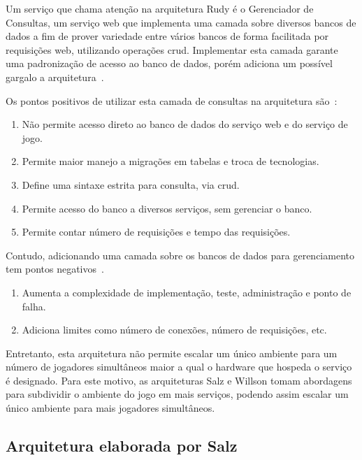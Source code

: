Um serviço que chama atenção na arquitetura Rudy é o Gerenciador de Consultas, um serviço web que implementa uma camada sobre diversos bancos de dados a fim de prover variedade entre vários bancos de forma facilitada por requisições web, utilizando operações \ac{crud}.
%
Implementar esta camada garante uma padronização de acesso ao banco de dados, porém adiciona um possível gargalo a arquitetura~\cite{matthiasrudy2011}.



Os pontos positivos de utilizar esta camada de consultas na arquitetura são~\cite{matthiasrudy2011}:
\begin{enumerate}
  \item Não permite acesso direto ao banco de dados do serviço web e do serviço de jogo.
  \item Permite maior manejo a migrações em tabelas e troca de tecnologias.
  \item Define uma sintaxe estrita para consulta, via \ac{crud}.
  \item Permite acesso do banco a diversos serviços, sem gerenciar o banco.
  \item Permite contar número de requisições e tempo das requisições.
\end{enumerate}



Contudo, adicionando uma camada sobre os bancos de dados para gerenciamento tem pontos negativos~\cite{matthiasrudy2011}.

\begin{enumerate}
  \item Aumenta a complexidade de implementação, teste, administração e ponto de falha.
  \item Adiciona limites como número de conexões, número de requisições, etc.
\end{enumerate}

Entretanto, esta arquitetura não permite escalar um único ambiente para um número de jogadores simultâneos maior a qual o hardware que hospeda o serviço é designado.
%
Para este motivo, as arquiteturas Salz e Willson tomam abordagens para subdividir o ambiente do jogo em mais serviços, podendo assim escalar um único ambiente para mais jogadores simultâneos.


\subsection{Arquitetura elaborada por Salz}
\label{salz}

